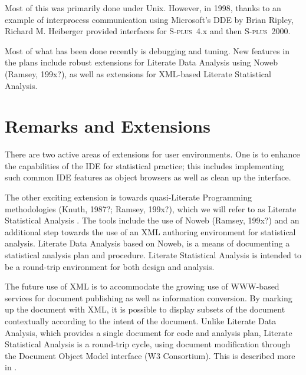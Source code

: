 \documentclass{article}
\newcommand*{\Splus}{\textsc{S-plus}}
\begin{document}
Most of this was primarily done under Unix.  However, in 1998, thanks
to an example of interprocess communication using Microsoft's DDE by
Brian Ripley, Richard M. Heiberger provided interfaces for \Splus~4.x
and then \Splus~2000.

Most of what has been done recently is debugging and tuning.  New
features in the plans include robust extensions for Literate Data
Analysis using Noweb (Ramsey, 199x?), as well as extensions for
XML-based Literate Statistical Analysis.

\section{Remarks and Extensions}
\label{sec:remarks}

There are two active areas of extensions for user environments.  One
is to enhance the capabilities of the IDE for statistical practice;
this includes implementing such common IDE features as object browsers
as well as clean up the interface.

The other exciting extension is towards quasi-Literate Programming
methodologies (Knuth, 1987?; Ramsey, 199x?), which we will refer to as
Literate Statistical Analysis \citep{ross:lunt:2001}. The tools include
the use of Noweb (Ramsey, 199x?) and an additional step towards the
use of an XML authoring environment for statistical analysis.
Literate Data Analysis based on Noweb, is a means of documenting a
statistical analysis plan and procedure.  Literate Statistical
Analysis is intended to be a round-trip environment for both design
and analysis.

The future use of XML is to accommodate the growing use of WWW-based
services for document publishing as well as information conversion.
By marking up the document with XML, it is possible to display subsets
of the document contextually according to the intent of the document.
Unlike Literate Data Analysis, which provides a single document for
code and analysis plan, Literate Statistical Analysis is a round-trip
cycle, using document modification through the Document Object Model
interface (W3 Consortium).  This is described more in
\citep{ross:lunt:2001}. 



\end{document}
